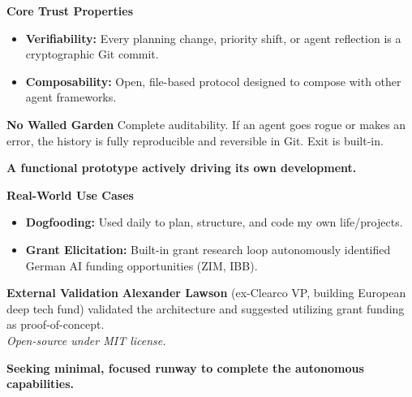 \documentclass[12pt]{article}
\newcommand{\slide}[1]{%
  \clearpage
  \pagecolor{bgdark}
  \color{textlight}
  \noindent{\Large\bfseries\color{aimgold}{#1}}\par
  \vspace{0.6cm}
}
\newcommand{\col}[2]{%
  \begin{minipage}[t]{#1\textwidth}
    #2
  \end{minipage}%
}
\newcommand{\card}[2]{%
  \colorbox{bgcard}{%
    \begin{minipage}{\dimexpr#1\textwidth-2\fboxsep-2\fboxrule\relax}%
      \vspace{0.2cm}%
      \color{textlight}%
      #2%
      \vspace{0.2cm}%
    \end{minipage}%
  }%
}
\newenvironment{slideitemize}{%
  \begin{itemize}%
    \setlength{\itemsep}{4pt}%
    \setlength{\parskip}{0pt}%
    \setlength{\parsep}{0pt}%
}{%
  \end{itemize}%
}
\begin{document}
\col{0.48}{
  \textbf{Core Trust Properties}
  \begin{slideitemize}
    \item \textbf{Verifiability:} Every planning change, priority shift, or agent reflection is a cryptographic Git commit.
    \item \textbf{Composability:} Open, file-based protocol designed to compose with other agent frameworks.
  \end{slideitemize}
}
\hfill
\col{0.48}{
  \card{1.0}{
    \hspace{0.2cm}%
    \begin{minipage}{\dimexpr\textwidth-0.4cm\relax}
      \textbf{\color{aimcyan}No Walled Garden}
      \vspace{0.2cm}
      Complete auditability. If an agent goes rogue or makes an error, the history is fully reproducible and reversible in Git. Exit is built-in.
    \end{minipage}
  }
}

\slide{Traction \& Validation: Dogfooding the Protocol}
\large \textbf{A functional prototype actively driving its own development.}
\vspace{0.8cm}
\normalsize

\col{0.48}{
  \textbf{Real-World Use Cases}
  \begin{slideitemize}
    \item \textbf{Dogfooding:} Used daily to plan, structure, and code my own life/projects.
    \item \textbf{Grant Elicitation:} Built-in grant research loop autonomously identified German AI funding opportunities (ZIM, IBB).
  \end{slideitemize}
}
\hfill
\col{0.48}{
  \card{1.0}{
    \hspace{0.2cm}%
    \begin{minipage}{\dimexpr\textwidth-0.4cm\relax}
      \textbf{\color{aimgold}External Validation}
      \vspace{0.2cm}
      \textbf{Alexander Lawson} (ex-Clearco VP, building European deep tech fund) validated the architecture and suggested utilizing grant funding as proof-of-concept. \\
      \textit{Open-source under MIT license.}
    \end{minipage}
  }
}

\slide{Ask \& Use of Funds}
\large \textbf{Seeking minimal, focused runway to complete the autonomous capabilities.}
\vspace{0.8cm}
\normalsize
\end{document}
